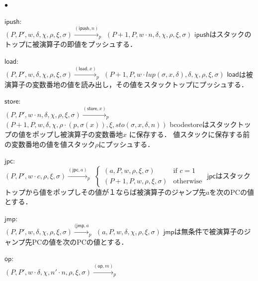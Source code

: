 \documentclass[submit,PRO]{ipsj}
\newcommand{\bcode}[1]{$\mathsf{#1}$}
\begin{document}
\begin{list}{$\bullet$}{}
\item \bcode{ipush}:\\
$(P,P',w,\delta,\chi,\rho,\xi,\sigma)\xrightarrow{(\mathsf{ipush},n)}_p$\newline
\qquad$(P+1,P,w\cdot n,\delta,\chi,\rho,\xi,\sigma)$\newline
\bcode{ipush}はスタックのトップに被演算子の即値をプッシュする．
\item \bcode{load}:\\
$(P,P',w,\delta,\chi,\rho,\xi,\sigma)\xrightarrow{(\mathsf{load},x)}_p$\newline
\qquad$(P+1,P,w\cdot lup(\sigma,x,\delta),\delta,\chi,\rho,\xi,\sigma)$\newline
\bcode{load}は被演算子の変数番地の値を読み出し，その値をスタックトップにプッシュする．
\item \bcode{store}:\\
$(P,P',w\cdot n,\delta,\chi,\rho,\xi,\sigma)\xrightarrow{(\mathsf{store},x)}_p$\newline
\qquad$(P+1,P,w,\delta,\chi,\rho\cdot(p,\sigma(x)),\xi,sto(\sigma,x,\delta,n))$\newline
bcode{store}はスタックトップの値をポップし被演算子の変数番地$x$ に保存する．
値スタックに保存する前の変数番地の値を値スタック$\rho$にプッシュする．
\item  \bcode{jpc}:\\
$(P,P',w\cdot c,\rho,\xi,\sigma)\xrightarrow{(\mathsf{jpc},a)}_p$\newline
\qquad\qquad$\begin{cases}
(a,P,w,\rho,\xi,\sigma) & \mbox{if $c=1$}\\
(P+1,P,w,\rho,\xi,\sigma) & \mbox{otherwise}
\end{cases}$
\newline
\bcode{jpc}はスタックトップから値をポップしその値が１ならば被演算子のジャンプ先$a$を次のPCの値とする． 
\item \bcode{jmp}:\\
$(P,P',w,\delta,\chi,\rho,\xi,\sigma)\xrightarrow{(\mathsf{jmp},a}_p$\newline
\qquad$(a,P,w,\delta,\chi,\rho,\xi,\sigma)$\newline
\bcode{jmp}は無条件で被演算子のジャンプ先PCの値を次のPCの値とする．
\item \bcode{op}:\\
$(P,P',w\cdot \delta,\chi,n'\cdot n,\rho,\xi,\sigma)\xrightarrow{(\mathsf{op},m)}_p$\newline

\end{list}
\end{document}
